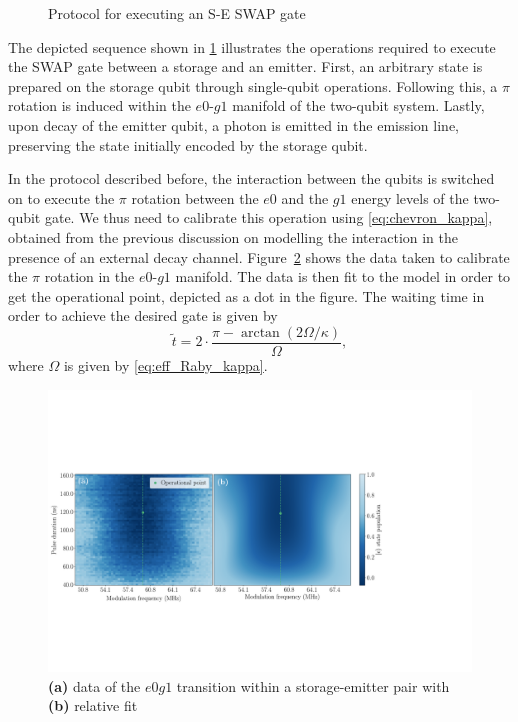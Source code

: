 \begin{figure}
    \centering
    
    \vspace{-1cm}
    \caption{Protocol for executing an S-E SWAP gate}
    \label{fig:S-E_SWAP}
\end{figure}

The depicted sequence shown in \cref{fig:S-E_SWAP} illustrates the operations required to execute the SWAP gate between a storage and an emitter.
First, an arbitrary state is prepared on the storage qubit through single-qubit operations.
Following this, a $\pi$ rotation is induced within the $e0$-$g1$ manifold of the two-qubit system.
Lastly, upon decay of the emitter qubit, a photon is emitted in the emission line, preserving the state initially encoded by the storage qubit.

In the protocol described before, the interaction between the qubits is switched on to execute the $\pi$ rotation between the $e0$ and the $g1$ energy levels of the two-qubit gate.
We thus need to calibrate this operation using \cref{eq:chevron_kappa}, obtained from the previous discussion on modelling the interaction in the presence of an external decay channel.
Figure~\ref{fig:SWAP_chevrons} shows the data taken to calibrate the $\pi$ rotation in the $e0$-$g1$ manifold.
The data is then fit to the model in order to get the operational point, depicted as a dot in the figure.
The waiting time in order to achieve the desired gate is given by
\begin{equation}
\label{eq:tilde_t_kappa}
    \widetilde{t} = 2 \cdot \frac{\pi - \arctan(2 \Omega / \kappa )}{\Omega} ,
\end{equation}
where $\Omega$ is given by \cref{eq:eff_Raby_kappa}.

\begin{figure}
    \centering
    \includegraphics[width = \textwidth]{Images/Chap3/a.pdf}
    \caption{\textbf{(a)} data of the $e0g1$ transition within a storage-emitter pair with \textbf{(b)} relative fit}
    \label{fig:SWAP_chevrons}
\end{figure}


